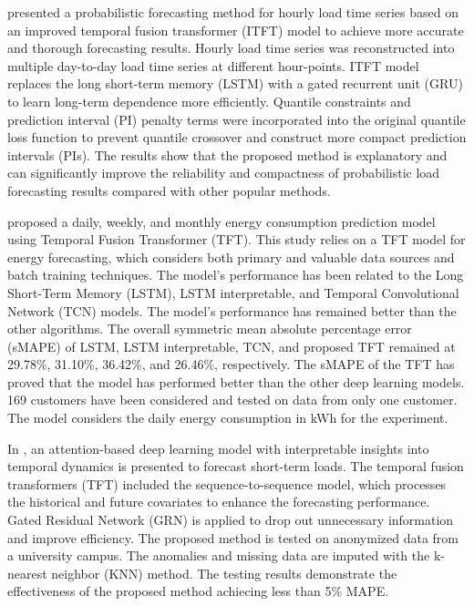 \cite{LI2023108743} presented a probabilistic forecasting method for hourly load time series based on an improved temporal fusion transformer (ITFT) model to achieve more accurate and thorough forecasting results.
Hourly load time series was reconstructed into multiple day-to-day load time series at different hour-points.
ITFT model replaces the long short-term memory (LSTM) with a gated recurrent unit (GRU) to learn long-term dependence more efficiently.
Quantile constraints and prediction interval (PI) penalty terms were incorporated into the original quantile loss function to prevent quantile crossover and construct more compact prediction intervals (PIs).
The results show that the proposed method is explanatory and can significantly improve the reliability and compactness of probabilistic load forecasting results compared with other popular methods.

\cite{NAZIR2023100888} proposed a daily, weekly, and monthly energy consumption prediction model using Temporal Fusion Transformer (TFT).
This study relies on a TFT model for energy forecasting, which considers both primary and valuable data sources and batch training techniques.
The model’s performance has been related to the Long Short-Term Memory (LSTM), LSTM interpretable, and Temporal Convolutional Network (TCN) models.
The model’s performance has remained better than the other algorithms.
The overall symmetric mean absolute percentage error (sMAPE) of LSTM, LSTM interpretable, TCN, and proposed TFT remained at 29.78\%, 31.10\%, 36.42\%, and 26.46\%, respectively.
The sMAPE of the TFT has proved that the model has performed better than the other deep learning models.
169 customers have been considered and tested on data from only one customer.
The model considers the daily energy consumption in kWh for the experiment.

In \cite{10033079}, an attention-based deep learning model with interpretable insights into temporal dynamics is presented to forecast short-term loads.
The temporal fusion transformers (TFT) included the sequence-to-sequence model, which processes the historical and future covariates to enhance the forecasting performance.
Gated Residual Network (GRN) is applied to drop out unnecessary information and improve efficiency.
The proposed method is tested on anonymized data from a university campus.
The anomalies and missing data are imputed with the k-nearest neighbor (KNN) method.
The testing results demonstrate the effectiveness of the proposed method achiecing less than 5\% MAPE.


